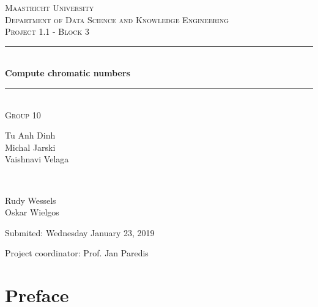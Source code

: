 \documentclass[a4paper]{report}
\begin{document}
	\begin{titlepage} 
		\newcommand{\HRule}{\rule{\linewidth}{0.5mm}} 
		
		\center
		
		\textsc{\LARGE Maastricht University}\\[1.5cm]
		
		\textsc{\Large Department of Data Science and Knowledge Engineering}\\[0.5cm] 
		
		\textsc{\large Project 1.1 - Block 3}\\[0.5cm] 
		
		\HRule\\[0.4cm]
		
		{\huge\bfseries Compute chromatic numbers}\\[0.4cm] 
		
		\HRule\\[1.5cm]
		
		\textsc{\large Group 10}\\[0.5cm]
		
		\begin{minipage}{0.6\textwidth}
			\begin{flushleft}
				Tu Anh Dinh\\Michal Jarski\\Vaishnavi Velaga
			\end{flushleft}
		\end{minipage}
		~
		\begin{minipage}{0.3\textwidth}
			\begin{flushleft}
				Rudy Wessels\\Oskar Wielgos\\
			\end{flushleft}
		\end{minipage}
	
		 \vspace{1cm}
		Submited: Wednesday January 23, 2019
		\vspace{3cm}
		\begin{flushleft}
			Project coordinator: Prof. Jan Paredis
		\end{flushleft}
		
	\end{titlepage}
	
	\chapter*{Preface}
\end{document}
